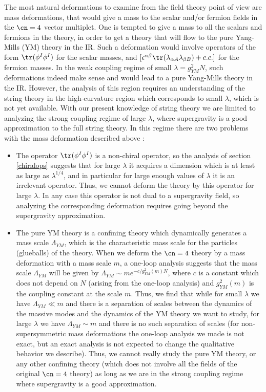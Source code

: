  The most natural deformations to examine from the field theory point
 of view are mass deformations, that would give a mass to the scalar
 and/or fermion fields in the $\cn=4$ vector multiplet. One is tempted
 to give a mass to all the scalars and fermions in the theory, in order
 to get a theory that will flow to the pure Yang-Mills (YM) theory in
 the IR. Such a deformation would involve operators of the form
 $\tr(\phi^I \phi^I)$ for the scalar masses, and $[\epsilon^{\alpha
 \beta} \tr(\lambda_{\alpha A} \lambda_{\beta B}) + c.c.]$ for the
 fermion masses. In the weak coupling regime of small $\lambda=g_{YM}^2
 N$, such deformations indeed make sense and would lead to a pure
 Yang-Mills theory in the IR. However, the analysis of this region
 requires an understanding of the string theory in the high-curvature
 region which corresponds to small $\lambda$, which is not yet
 available. With our present knowledge of string theory we are limited
 to analyzing the strong coupling regime of large $\lambda$, where
 supergravity is a good approximation to the full string theory. In
 this regime there are two problems with the mass deformation described
 above :
 \begin{itemize}
 \item{} The operator $\tr(\phi^I \phi^I)$ is a non-chiral operator, so
 the analysis of section \ref{chiralops} suggests that for large
 $\lambda$ it acquires a dimension which is at least as large as
 $\lambda^{1/4}$, and in particular for large enough values of
 $\lambda$ it is an irrelevant operator. Thus, we cannot deform the
 theory by this operator for large $\lambda$. In any case this operator
 is not dual to a supergravity field, so analyzing the corresponding
 deformation requires going beyond the supergravity approximation.
 \item{} The pure YM theory is a confining theory which dynamically
 generates a mass scale $\Lambda_{YM}$, which is the characteristic
 mass scale for the particles (glueballs) of the theory. When we deform
 the $\cn=4$ theory by a mass deformation with a mass scale $m$, a
 one-loop analysis suggests that the mass scale $\Lambda_{YM}$ will be
 given by $\Lambda_{YM} \sim m e^{-c/g_{YM}^2(m) N}$, where $c$ is a
 constant which does not depend on $N$ (arising from the one-loop
 analysis) and $g_{YM}^2(m)$ is the coupling constant at the scale
 $m$. Thus, we find that while for small $\lambda$ we have 
 $\Lambda_{YM} \ll
 m$ and there is a separation of scales between the dynamics of the
 massive modes and the dynamics of the YM theory we want to study, for
 large $\lambda$ we have $\Lambda_{YM} \sim m$ and there is no such
 separation of scales (for non-supersymmetric mass deformations the
 one-loop analysis we made is not exact, but an exact analysis is not
 expected to change the qualitative behavior we describe). Thus, we
 cannot really study the pure YM theory, or any other confining theory
 (which does not involve all the fields of the original $\cn=4$ theory)
 as long as we are in the strong coupling regime where supergravity is
 a good approximation.
 \end{itemize}
